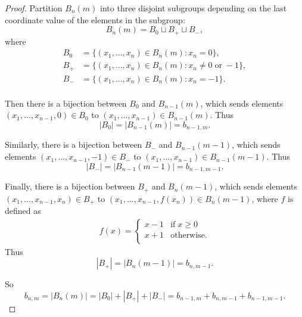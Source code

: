 \documentclass{article}
\begin{document}
\begin{enumerate}[label={\bf Q\arabic*:}]
    \begin{proof}
      Partition $B_n(m)$ into three disjoint subgroups depending on the
      last coordinate value of the elements in the subgroup:
      \[B_n(m) =B_0 \sqcup B_+ \sqcup B_-,\]
      where
      \begin{align*}
        B_0 &=\{(x_1,\ldots,x_n)\in B_n(m): x_n=0\},\\
        B_+ &=\{(x_1,\ldots,x_n)\in B_n(m): x_n\neq0\; \text{or}\; -1\},\\
        B_- &=\{(x_1,\ldots,x_n)\in B_n(m): x_n=-1\}.\\
      \end{align*}

      Then there is a bijection between $B_0$ and $B_{n-1}(m)$, which sends
      elements $(x_1,\ldots,x_{n-1},0)\in B_0$ to $(x_1,\ldots,x_{n-1})\in
      B_{n-1}(m)$. Thus
      \[|B_0|=|B_{n-1}(m)|=b_{n-1,m}.\]

      Similarly, there is a bijection between $B_-$ and $B_{n-1}(m-1)$, which
      sends elements $(x_1,\ldots,x_{n-1},-1)\in B_-$ to
      $(x_1,\ldots,x_{n-1})\in B_{n-1}(m-1)$. Thus
      \[|B_-|=|B_{n-1}(m-1)|=b_{n-1,m-1}.\]

      Finally, there is a bijection between $B_+$ and $B_{n}(m-1)$, which
      sends elements $(x_1,\ldots,x_{n-1},x_n)\in B_+$ to
      $(x_1,\ldots,x_{n-1},f(x_n))\in B_{n}(m-1)$, where $f$ is defined as
      \begin{align*}
        f(x)=\begin{cases}
          x-1 &\text{if}\; x\geq0\\
          x+1 &\text{otherwise}.\\
        \end{cases}
      \end{align*}
      Thus
      \[|B_+|=|B_{n}(m-1)|=b_{n,m-1}.\]

      So
      \[b_{n,m} =|B_n(m)| =|B_0|+|B_+|+|B_-| =b_{n-1,m} +b_{n,m-1}
      +b_{n-1,m-1}.\]
    \end{proof}
\end{enumerate}
\end{document}

